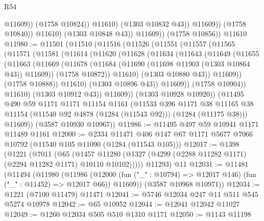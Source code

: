 \begin{lexlean}{R54}
\begin{coremodule}
                              @11609))
                          (@1758 @10824))
                        @11610)
                      (@1303 @10832 @43))
                    @11609))
                (@1758 @10840))
              @11610)
            (@1303 @10848 @43))
          @11609))
      (@1758 @10856))
    @11610
@11980 := @11501
    (@11510
      (@11516
        (@11526
          (@11551
            (@11557
              (@11565
                (@11571
                  (@11581
                    (@11614
                      (@11620
                        (@11628
                          (@11634
                            (@11643
                              (@11649
                                (@11655
                                  (@11663
                                    (@11669
                                      (@11678
                                        (@11684 (@11690 (@11698 @11903 (@1303 @10864 @43)) @11609))
                                        (@1758 @10872))
                                      @11610)
                                    (@1303 @10880 @43))
                                  @11609))
                              (@1758 @10888))
                            @11610)
                          (@1303 @10896 @43))
                        @11609))
                    (@1758 @10904))
                  @11610)
                (@1303 @10912 @43))
              @11609))
          (@1303 @10928 @10920))
        (@11495
          @490
          @59
          @1171
          @1171
          @11154
          @1161
          (@11533
            @396
            @1171
            @38
            @11165
            @38
            @11154
            (@11540 @92 @4878 (@1284 (@11543 @92)))
            (@1284 (@11175 @38)))
          @11609))
      (@3587 @10930 @10967))
@11986 := @11495 @497 @59 @10941 @1171 @11489 @1161
@12000 := @2334
    @11471
    @406
    @147
    @67
    @1171
    @5677
    @7066
    @10792
    (@11540 @105 @11090 (@1284 (@11543 @105)))
@12017 := @1398
    (@1221
      (@7011
        (@65
          (@1457 @11280 (@1327 (@4299 (@2288 @11282 @1171) (@2294 @11282 @1171) @10110 @10102)))))
      @11293)
    @11
@12031 := @11481
    (@11494
      (@11980
        (@11986
          (@12000 (fun ("_" : @10794) => @12017 @146) (fun ("_" : @11452) => @12017 @66))
          @11609))
      (@3587 @10968 @10971))
@12034 := @1221 (@7100 @11479) @11471
@12041 := @5746 @12034 @247 @11 @511 @545 @5274 @10978
@12042 := @65 @10952
@12044 := @12041 @12042 @11027
@12049 := @1260 @12034 @505 @510 @1310 @1171
@12050 := @1143 @11198

\end{coremodule}
\end{lexlean}
